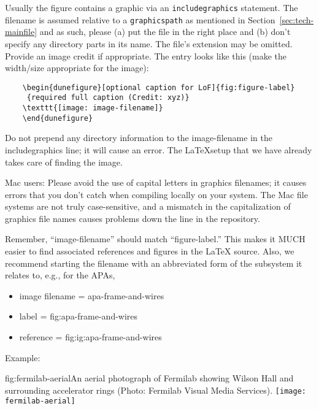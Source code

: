 Usually the figure contains a graphic via an \texttt{includegraphics} statement.
The filename is assumed relative to a \texttt{graphicspath} as
mentioned in Section~\ref{sec:tech-mainfile} and as such, please (a) put the file in the right place and (b) don't
 specify any directory parts in its name. 
The file's extension may be omitted. Provide an image credit if appropriate. The entry looks like this (make the width/size appropriate for the image):

\begin{verbatim}
    \begin{dunefigure}[optional caption for LoF]{fig:figure-label}
     {required full caption (Credit: xyz)}
    \texttt{[image: image-filename]}
    \end{dunefigure}
\end{verbatim}

Do not prepend any directory information to the image-filename in the includegraphics line; it will cause an error. The \LaTeX setup that we have already takes care of finding the image. 

Mac users: Please avoid the use of capital letters in graphics filenames; it causes errors that you don't catch when compiling locally on your system. The Mac file systems are not truly case-sensitive, and a mismatch in the capitalization of graphics file names causes problems down the line in the repository.


Remember, ``image-filename'' should match ``figure-label.'' This makes it MUCH easier to find associated references and figures in the \LaTeX{}  source.  Also, we recommend starting the filename with an abbreviated form of the subsystem it relates to, e.g., for the APAs,

\begin{itemize}
\item image filename = apa-frame-and-wires
\item label = fig:apa-frame-and-wires
\item reference = fig:ig:apa-frame-and-wires
\end{itemize}

Example:
\begin{dunefigure}{fig:fermilab-aerial}{An aerial photograph of Fermilab
    showing Wilson Hall and surrounding accelerator rings (Photo: Fermilab
    Visual Media Services).}
  \texttt{[image: fermilab-aerial]}
\end{dunefigure}


